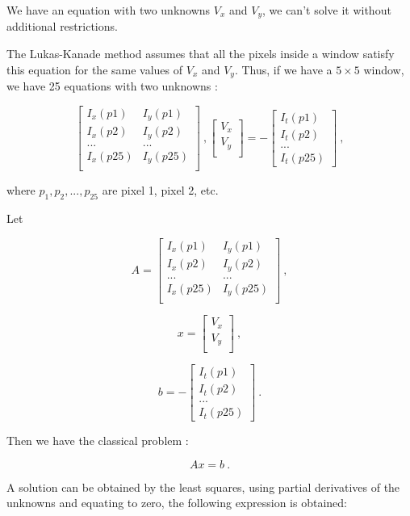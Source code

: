 We have an equation with two unknowns $V_x$ and $V_y$, we can't solve it without additional restrictions.

The Lukas-Kanade method assumes that all the pixels inside a window satisfy this equation for the same 
values of $V_x$ and $V_y$. Thus, if we have a $5\times5$ window, we have 25 equations with two unknowns :

$$
\begin{bmatrix}
I_x(p1) & I_y(p1) \\
I_x(p2) & I_y(p2) \\
... & ... \\
I_x(p25) & I_y(p25)\\
\end{bmatrix}  \ ,
\begin{bmatrix}
V_x \\
V_y\\
\end{bmatrix}
=
-\begin{bmatrix}
I_t(p1) \\
I_t(p2) \\
...     \\
I_t(p25) 
\end{bmatrix} \ ,
$$

where $p_1, p_2, ..., p_{25}$ are pixel 1, pixel 2, etc.

Let 

$$
A = 
\begin{bmatrix}
I_x(p1) & I_y(p1) \\
I_x(p2) & I_y(p2) \\
... & ... \\
I_x(p25) & I_y(p25)\\
\end{bmatrix}  \ ,
$$

$$
x=
\begin{bmatrix}
V_x \\
V_y\\
\end{bmatrix} \ ,
$$

$$
b=
-\begin{bmatrix}
I_t(p1) \\
I_t(p2) \\
...     \\
I_t(p25) 
\end{bmatrix} \ .
$$

\noindent Then we have the classical problem :

$$ 
Ax = b\ .
$$

\noindent A solution can be obtained by the least squares, using partial derivatives of the unknowns and equating to zero, the following expression
 is obtained:

